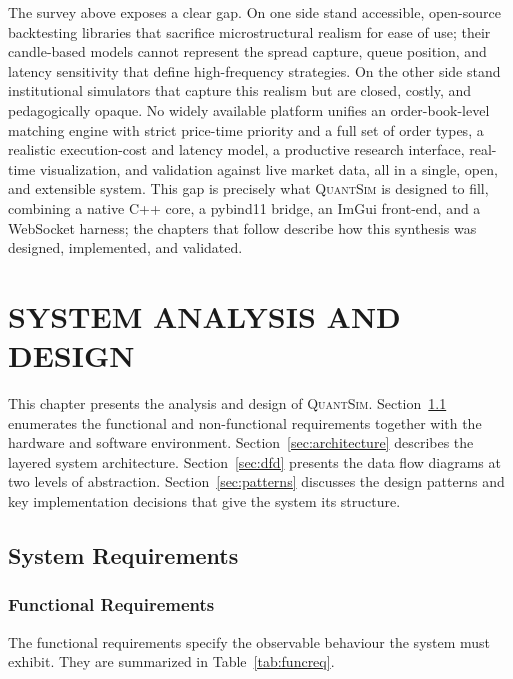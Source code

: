 \documentclass[12pt,oneside,a4paper]{report}
\newcommand{\quantsim}{\textsc{QuantSim}}
\begin{document}
The survey above exposes a clear gap. On one side stand accessible, open-source backtesting libraries that sacrifice microstructural realism for ease of use; their candle-based models cannot represent the spread capture, queue position, and latency sensitivity that define high-frequency strategies. On the other side stand institutional simulators that capture this realism but are closed, costly, and pedagogically opaque. No widely available platform unifies an order-book-level matching engine with strict price-time priority and a full set of order types, a realistic execution-cost and latency model, a productive research interface, real-time visualization, and validation against live market data, all in a single, open, and extensible system. This gap is precisely what \quantsim{} is designed to fill, combining a native C++ core, a pybind11 bridge, an ImGui front-end, and a WebSocket harness; the chapters that follow describe how this synthesis was designed, implemented, and validated.

\chapter{SYSTEM ANALYSIS AND DESIGN}
\label{ch:design}

This chapter presents the analysis and design of \quantsim{}. Section~\ref{sec:requirements} enumerates the functional and non-functional requirements together with the hardware and software environment. Section~\ref{sec:architecture} describes the layered system architecture. Section~\ref{sec:dfd} presents the data flow diagrams at two levels of abstraction. Section~\ref{sec:patterns} discusses the design patterns and key implementation decisions that give the system its structure.

\section{System Requirements}
\label{sec:requirements}

\subsection{Functional Requirements}

The functional requirements specify the observable behaviour the system must exhibit. They are summarized in Table~\ref{tab:funcreq}.
\end{document}
